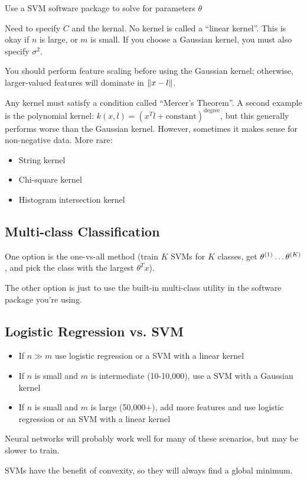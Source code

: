 Use a SVM software package to solve for parameters $\theta$

Need to specify $C$ and the kernal.
No kernel is called a ``linear kernel''.  This is okay if $n$ is large, or $m$ is small.
If you choose a Gaussian kernel, you must also specify $\sigma^2$.

You should perform feature scaling before using the Gaussian kernel;
otherwise, larger-valued features will dominate in $\left\lVert x-l \right\rVert$.

Any kernel must satisfy a condition called ``Mercer's Theorem''.
A second example is the polynomial kernel:
$k(x,l) = (x^T l + \text{constant})^\text{degree}$,
but this generally performs worse than the Gaussian kernel.
However, sometimes it makes sense for non-negative data.
More rare:

\begin{itemize}
    \item String kernel
    \item Chi-square kernel
    \item Histogram intersection kernel
\end{itemize}

\subsection{Multi-class Classification}

One option is the one-vs-all method
(train $K$ SVMs for $K$ classes, 
get $\theta_{}^{(1)}\dots\theta_{}^{(K)}$, 
and pick the class with the largest $\theta^T x$).

The other option is just to use the built-in multi-class utility
in the software package you're using.

\subsection{Logistic Regression vs. SVM}

\begin{itemize}
    \item If $n \gg m$
        use logistic regression or a SVM with a linear kernel
    \item If $n$ is small and $m$ is intermediate (10-10,000),
        use a SVM with a Gaussian kernel
    \item If $n$ is small and $m$ is large (50,000+), add more features
        and use logistic regression or an SVM with a linear kernel
\end{itemize}

Neural networks will probably work well for many of these scenarios, 
but may be slower to train.

SVMs have the benefit of convexity, so they will always find a global minimum.